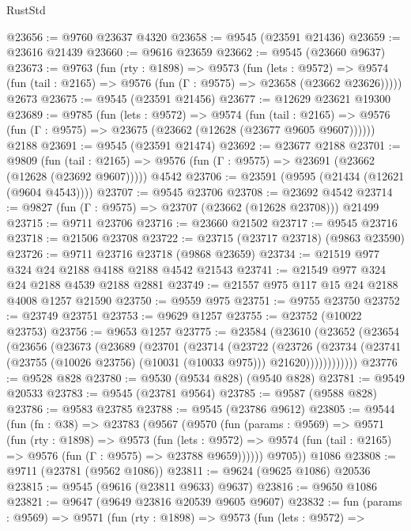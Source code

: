 \begin{lexlean}{RustStd}
\begin{coremodule}
@23656 := @9760 @23637 @4320
@23658 := @9545 (@23591 @21436)
@23659 := @23616 @21439
@23660 := @9616 @23659
@23662 := @9545 (@23660 @9637)
@23673 := @9763
    (fun (rty : @1898) =>
    @9573
      (fun (lets : @9572) =>
      @9574 (fun (tail : @2165) => @9576 (fun (Γ : @9575) => @23658 (@23662 @23626)))))
    @2673
@23675 := @9545 (@23591 @21456)
@23677 := @12629 @23621 @19300
@23689 := @9785
    (fun (lets : @9572) =>
    @9574
      (fun (tail : @2165) =>
      @9576 (fun (Γ : @9575) => @23675 (@23662 (@12628 (@23677 @9605 @9607))))))
    @2188
@23691 := @9545 (@23591 @21474)
@23692 := @23677 @2188
@23701 := @9809
    (fun (tail : @2165) => @9576 (fun (Γ : @9575) => @23691 (@23662 (@12628 (@23692 @9607)))))
    @4542
@23706 := @23591 (@9595 (@21434 (@12621 (@9604 @4543))))
@23707 := @9545 @23706
@23708 := @23692 @4542
@23714 := @9827 (fun (Γ : @9575) => @23707 (@23662 (@12628 @23708))) @21499
@23715 := @9711 @23706
@23716 := @23660 @21502
@23717 := @9545 @23716
@23718 := @21506 @23708
@23722 := @23715 (@23717 @23718) (@9863 @23590)
@23726 := @9711 @23716 @23718 (@9868 @23659)
@23734 := @21519 @977 @324 @24 @2188 @4188 @2188 @4542 @21543
@23741 := @21549 @977 @324 @24 @2188 @4539 @2188 @2881
@23749 := @21557 @975 @117 @15 @24 @2188 @4008 @1257 @21590
@23750 := @9559 @975
@23751 := @9755 @23750
@23752 := @23749 @23751
@23753 := @9629 @1257
@23755 := @23752 (@10022 @23753)
@23756 := @9653 @1257
@23775 := @23584
    (@23610
      (@23652
        (@23654
          (@23656
            (@23673
              (@23689
                (@23701
                  (@23714
                    (@23722
                      (@23726
                        (@23734
                          (@23741 (@23755 (@10026 @23756) (@10031 (@10033 @975))) @21620))))))))))))
@23776 := @9528 @828
@23780 := @9530 (@9534 @828) (@9540 @828)
@23781 := @9549 @20533
@23783 := @9545 (@23781 @9564)
@23785 := @9587 (@9588 @828)
@23786 := @9583 @23785
@23788 := @9545 (@23786 @9612)
@23805 := @9544
    (fun (fn : @38) =>
    @23783
      (@9567
        (@9570
          (fun (params : @9569) =>
          @9571
            (fun (rty : @1898) =>
            @9573
              (fun (lets : @9572) =>
              @9574 (fun (tail : @2165) => @9576 (fun (Γ : @9575) => @23788 @9659))))))
        @9705))
    @1086
@23808 := @9711 (@23781 (@9562 @1086))
@23811 := @9624 (@9625 @1086) @20536
@23815 := @9545 (@9616 (@23811 @9633) @9637)
@23816 := @9650 @1086
@23821 := @9647 (@9649 @23816 @20539 @9605 @9607)
@23832 := fun (params : @9569) =>
  @9571
    (fun (rty : @1898) =>
    @9573
      (fun (lets : @9572) =>

\end{coremodule}
\end{lexlean}

